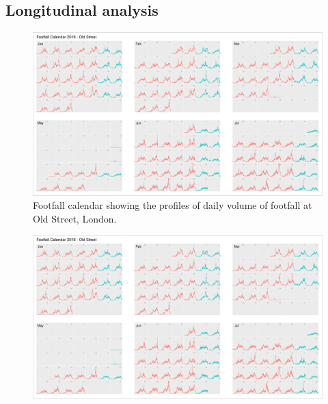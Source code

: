 \subsection{Longitudinal analysis}

\lipsum[1]

\lipsum[1-2]

\cleartoleftpage
{}
\begin{figure}
  \forceversofloat
  \includegraphics[width=172mm,trim={0 0 1310 -42},clip]{images/applications-footfall-calendar.png}
  \caption{Footfall calendar showing the profiles of daily volume of footfall at Old Street, London.}
  \label{}
\end{figure}
\clearpage
\begin{figure}
  \forcerectofloat
  \includegraphics[width=172mm,trim={1315 0 0 0},clip]{images/applications-footfall-calendar.png}
  \caption[]{}
  \label{}
\end{figure}
\restoregeometry
\clearpage


